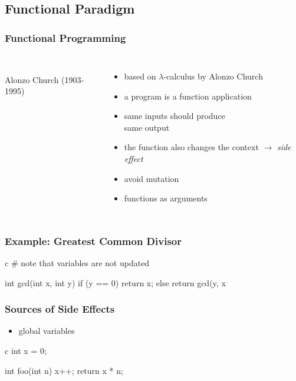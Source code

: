 \documentclass[dvipsnames]{beamer}
\theoremstyle{plain}
\begin{document}
\subsection{Functional Paradigm}

\begin{frame}
  \frametitle{Functional Programming}

  \begin{columns}
    \begin{center}
      \\
      Alonzo Church (1903-1995)
    \end{center}

    \begin{itemize}
      \item based on $\lambda$-calculus by Alonzo Church
      \item a program is a function application
      \item same inputs should produce\\
        same output

      \pause
      \medskip
      \item the function also changes
        the context $\rightarrow$ \emph{side effect}
      \item \alert{avoid mutation}

      \pause
      \medskip
      \item functions as arguments
    \end{itemize}
  \end{columns}
\end{frame}

\begin{frame}[fragile]
  \frametitle{Example: Greatest Common Divisor}

  \begin{example}
    \begin{pygments}[]{c}
# note that variables are not updated

int gcd(int x, int y)
{
    if (y == 0)
        return x;
    else
        return gcd(y, x %
}
    \end{pygments}
  \end{example}
\end{frame}

\begin{frame}[fragile]
  \frametitle{Sources of Side Effects}

  \begin{itemize}
    \item global variables
  \end{itemize}

  \begin{example}
    \begin{pygments}[]{c}
int x = 0;

int foo(int n)
{
    x++;
    return x * n;
}
    \end{pygments}
  \end{example}
\end{frame}
\end{document}
